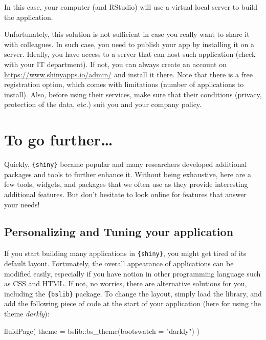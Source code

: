 \documentclass[
]{krantz}
\makeatletter
\newenvironment{Shaded}{\begin{snugshade}}{\end{snugshade}}
\newcommand{\AttributeTok}[1]{\textcolor[rgb]{0.61,0.61,0.61}{#1}}
\newcommand{\FunctionTok}[1]{\textcolor[rgb]{0,0,0}{#1}}
\newcommand{\NormalTok}[1]{#1}
\newcommand{\SpecialCharTok}[1]{\textcolor[rgb]{0,0,0}{#1}}
\newcommand{\StringTok}[1]{\textcolor[rgb]{0.5,0.5,0.5}{#1}}
\newenvironment{kframe}{%
\medskip{}
\setlength{\fboxsep}{.8em}
 \def\at@end@of@kframe{}%
 \ifinner\ifhmode%
  \def\at@end@of@kframe{\end{minipage}}%
  \begin{minipage}{\columnwidth}%
 \fi\fi%
 \def\FrameCommand##1{\hskip\@totalleftmargin \hskip-\fboxsep
 \colorbox{shadecolor}{##1}\hskip-\fboxsep
     \hskip-\linewidth \hskip-\@totalleftmargin \hskip\columnwidth}%
 \MakeFramed {\advance\hsize-\width
   \@totalleftmargin\z@ \linewidth\hsize
   \@setminipage}}%
 {\par\unskip\endMakeFramed%
 \at@end@of@kframe}
\renewenvironment{Shaded}{\begin{kframe}}{\end{kframe}}
\makeatother
\begin{document}
In this case, your computer (and RStudio) will use a virtual local server to build the application.

Unfortunately, this solution is not sufficient in case you really want to share it with colleagues. In such case, you need to publish your app by installing it on a server. Ideally, you have access to a server that can host such application (check with your IT department). If not, you can always create an account on \url{https://www.shinyapps.io/admin/} and install it there. Note that there is a free registration option, which comes with limitations (number of applications to install). Also, before using their services, make sure that their conditions (privacy, protection of the data, etc.) suit you and your company policy.

\hypertarget{to-go-further-2}{%
\section{To go further\ldots{}}\label{to-go-further-2}}

Quickly, \texttt{\{shiny\}} became popular and many researchers developed additional packages and tools to further enhance it. Without being exhaustive, here are a few tools, widgets, and packages that we often use as they provide interesting additional features. But don't hesitate to look online for features that answer your needs!

\hypertarget{personalizing-and-tuning-your-application}{%
\subsection{Personalizing and Tuning your application}\label{personalizing-and-tuning-your-application}}

If you start building many applications in \texttt{\{shiny\}}, you might get tired of its default layout. Fortunately, the overall appearance of applications can be modified easily, especially if you have notion in other programming language such as CSS and HTML. If not, no worries, there are alternative solutions for you, including the \texttt{\{bslib\}} package.
To change the layout, simply load the library, and add the following piece of code at the start of your application (here for using the theme \emph{darkly}):

\begin{Shaded}
\begin{Highlighting}[]
\FunctionTok{fluidPage}\NormalTok{(}
  \AttributeTok{theme =}\NormalTok{ bslib}\SpecialCharTok{::}\FunctionTok{bs\_theme}\NormalTok{(}\AttributeTok{bootswatch =} \StringTok{"darkly"}\NormalTok{)}
\NormalTok{)}
\end{Highlighting}
\end{Shaded}
\end{document}
